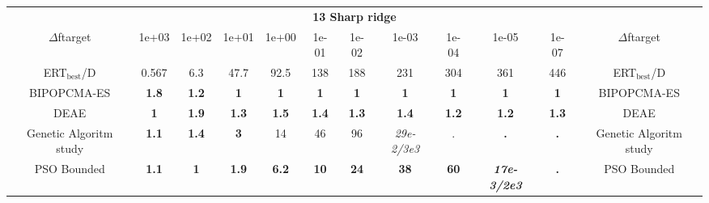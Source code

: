 \begin{tabular}{cccccccccccc}
 & \multicolumn{10}{c}{{\normalsize \textbf{13 Sharp ridge}}}\\
$\Delta$ftarget& 1e+03& 1e+02& 1e+01& 1e+00& 1e-01& 1e-02& 1e-03& 1e-04& 1e-05& 1e-07 & $\Delta$ftarget \\
ERT$_{\textrm{best}}$/D& 0.567& 6.3& 47.7& 92.5& 138& 188& 231& 304& 361& 446 & ERT$_{\textrm{best}}$/D \\
\hline
BIPOPCMA-ES & \textbf{1.8} & \textbf{1.2} & \textbf{1} & \textbf{1} & \textbf{1} & \textbf{1} & \textbf{1} & \textbf{1} & \textbf{1} & \textbf{1} & BIPOPCMA-ES \cite{add_an_entry_for_BIPOPCMA-ES_in_bbob.bib}\\
DEAE & \textbf{1} & \textbf{1.9} & \textbf{1.3} & \textbf{1.5} & \textbf{1.4} & \textbf{1.3} & \textbf{1.4} & \textbf{1.2} & \textbf{1.2} & \textbf{1.3} & DEAE \cite{add_an_entry_for_DEAE_in_bbob.bib}\\
Genetic Algoritm study & \textbf{1.1} & \textbf{1.4} & \textbf{3} & 14 & 46 & 96 & \textit{29e-2}\textit{/3e3} & . & \textbf{.} & \textbf{.} & Genetic Algoritm study \cite{add_an_entry_for_Genetic Algoritm study_in_bbob.bib}\\
PSO Bounded & \textbf{1.1} & \textbf{1} & \textbf{1.9} & \textbf{6.2} & \textbf{10} & \textbf{24} & \textbf{38} & \textbf{60} & \textbf{\textit{17e-3}\textit{/2e3}} & \textbf{.} & PSO Bounded \cite{add_an_entry_for_PSO Bounded_in_bbob.bib}
\end{tabular}
